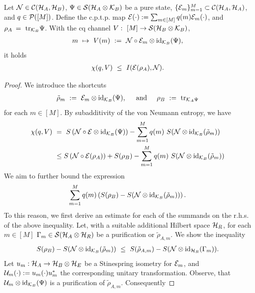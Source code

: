 \begin{lemma} \label{lemma:ent_ass_conv_pre}
	Let ${\mathcal N} \in {\mathcal C}({\mathcal H}_A, {\mathcal H}_B)$, $\Psi \in {\mathcal S}({\mathcal H}_A \otimes {\mathcal K}_B)$ be a pure state, $\{{\mathcal E}_m\}_{m=1}^{M} \subset {\mathcal C}({\mathcal H}_A, {\mathcal H}_A)$, and $q \in {\mathcal P}([M])$. Define the c.p.t.p. map ${\mathcal E}(\cdot) := \sum_{m\in [M]} q(m) {\mathcal E}_m(\cdot)$, and $\rho_A \:= \ \mathrm{tr}_{{\mathcal K}_B}\Psi$. With the cq channel $V:\ [M] \rightarrow {\mathcal S}({\mathcal H}_B \otimes {\mathcal K}_B)$,
	\begin{align*}
	 m \ \mapsto \ V(m) \ := \ {\mathcal N}\circ {\mathcal E}_m \otimes \mathrm{id}_{{\mathcal K}_B}(\Psi),
	\end{align*}
	it holds 
	\begin{align}
	\chi(q,V) \ \leq \ I({\mathcal E}(\rho_A), {\mathcal N}).  
	\end{align}
\end{lemma}
\begin{proof}
We introduce the shortcuts 
\begin{align*}
\tilde{\rho}_m \ := \ {\mathcal E}_m \otimes \mathrm{id}_{{\mathcal K}_B}(\Psi), \hspace{.5cm} \text{and} \hspace{.5cm} \rho_{B} \ := \ \mathrm{tr}_{{\mathcal K}_A \Psi}
\end{align*}
for each $m \in [M]$. By subadditivity of the von Neumann entropy, we have 
\begin{align*}
\chi(q,V) \
&= \ S\left({\mathcal N}\circ {\mathcal E} \otimes \mathrm{id}_{{\mathcal K}_B}(\Psi)\right) 
 - \sum_{m=1}^M q(m) \ S({\mathcal N} \otimes \mathrm{id}_{{\mathcal K}_B}(\tilde{\rho}_m)) \\
&\leq S\left({\mathcal N}\circ {\mathcal E}(\rho_{A}) \right)   + S(\rho_B) -  \sum_{m=1}^M q(m) \ S({\mathcal N} \otimes \mathrm{id}_{{\mathcal K}_B}(\tilde{\rho}_m)) 
\end{align*}
We aim to further bound the expression
\begin{align}
 \sum_{m=1}^M q(m) \left( S(\rho_B) - S({\mathcal N} \otimes \mathrm{id}_{{\mathcal K}_B}(\tilde{\rho}_m))\right).
\end{align}
 To this reason, we first derive an estimate for each of the summands on the r.h.s. of the above inequality.
 Let, with a suitable additional Hilbert space ${\mathcal H}_R$, for each $m \in [M]$ $\Gamma_m \in {\mathcal S}({\mathcal H}_A \otimes {\mathcal H}_R)$ be a purification or $\tilde{\rho}_{A,m}$. We show the inequality
 \begin{align}
 S(\rho_B) - S(\cN\otimes \id_{\cK_B}(\tilde{\rho}_m)) \ \leq \ S(\tilde{\rho}_{A,m}) - S(\cN \otimes \id_{\cH_R}(\Gamma_m)). \label{lemma:ent_ass_conv_pre_1}
 \end{align}
 Let $u_m: {\mathcal H}_A \rightarrow {\mathcal H}_B \otimes {\mathcal H}_E$ be a Stinespring isometry for ${\mathcal E}_m$, and ${\mathcal U}_m(\cdot) := u_m(\cdot)u_m^\ast$ the corresponding unitary transformation. Observe, that ${\mathcal U}_m \otimes \mathrm{id}_{{\mathcal K}_B}(\Psi)$ is a purification of $\tilde{\rho}_{A,m}$. Consequently 

\end{proof}
